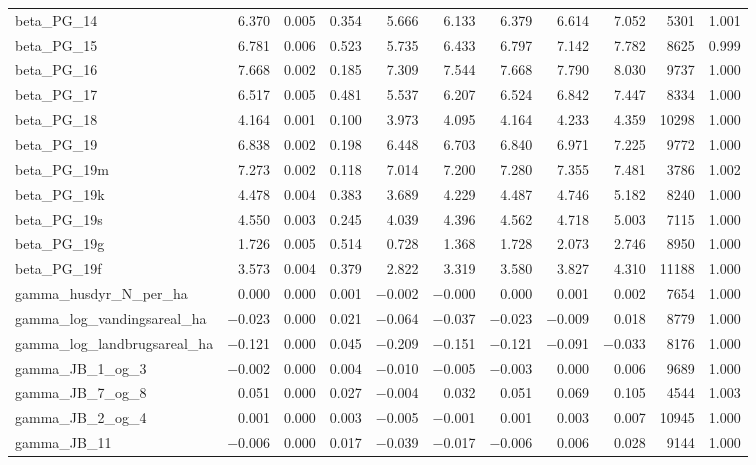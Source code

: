 \documentclass[12pt]{article}
\begin{document}
\begin{longtable}{lrrrrrrrrrr}
beta\_PG\_14  &  6.370 & 0.005 & 0.354 &  5.666 &  6.133 &  6.379 &  6.614 &  7.052 &  5301 & 1.001 \\
beta\_PG\_15  &  6.781 & 0.006 & 0.523 &  5.735 &  6.433 &  6.797 &  7.142 &  7.782 &  8625 & 0.999 \\
beta\_PG\_16  &  7.668 & 0.002 & 0.185 &  7.309 &  7.544 &  7.668 &  7.790 &  8.030 &  9737 & 1.000 \\
beta\_PG\_17  &  6.517 & 0.005 & 0.481 &  5.537 &  6.207 &  6.524 &  6.842 &  7.447 &  8334 & 1.000 \\
beta\_PG\_18  &  4.164 & 0.001 & 0.100 &  3.973 &  4.095 &  4.164 &  4.233 &  4.359 & 10298 & 1.000 \\
beta\_PG\_19  &  6.838 & 0.002 & 0.198 &  6.448 &  6.703 &  6.840 &  6.971 &  7.225 &  9772 & 1.000 \\
beta\_PG\_19m &  7.273 & 0.002 & 0.118 &  7.014 &  7.200 &  7.280 &  7.355 &  7.481 &  3786 & 1.002 \\
beta\_PG\_19k &  4.478 & 0.004 & 0.383 &  3.689 &  4.229 &  4.487 &  4.746 &  5.182 &  8240 & 1.000 \\
beta\_PG\_19s &  4.550 & 0.003 & 0.245 &  4.039 &  4.396 &  4.562 &  4.718 &  5.003 &  7115 & 1.000 \\
beta\_PG\_19g &  1.726 & 0.005 & 0.514 &  0.728 &  1.368 &  1.728 &  2.073 &  2.746 &  8950 & 1.000 \\
beta\_PG\_19f &  3.573 & 0.004 & 0.379 &  2.822 &  3.319 &  3.580 &  3.827 &  4.310 & 11188 & 1.000 \\
\addlinespace
gamma\_husdyr\_N\_per\_ha        &  0.000 & 0.000 & 0.001 & $-$0.002 & $-$0.000 &  0.000 &  0.001 &  0.002 &  7654 & 1.000 \\
gamma\_log\_vandingsareal\_ha   & $-$0.023 & 0.000 & 0.021 & $-$0.064 & $-$0.037 & $-$0.023 & $-$0.009 &  0.018 &  8779 & 1.000 \\
gamma\_log\_landbrugsareal\_ha  & $-$0.121 & 0.000 & 0.045 & $-$0.209 & $-$0.151 & $-$0.121 & $-$0.091 & $-$0.033 &  8176 & 1.000 \\
gamma\_JB\_1\_og\_3  & $-$0.002 & 0.000 & 0.004 & $-$0.010 & $-$0.005 & $-$0.003 &  0.000 &  0.006 &  9689 & 1.000 \\
gamma\_JB\_7\_og\_8  &  0.051 & 0.000 & 0.027 & $-$0.004 &  0.032 &  0.051 &  0.069 &  0.105 &  4544 & 1.003 \\
gamma\_JB\_2\_og\_4  &  0.001 & 0.000 & 0.003 & $-$0.005 & $-$0.001 &  0.001 &  0.003 &  0.007 & 10945 & 1.000 \\
gamma\_JB\_11        & $-$0.006 & 0.000 & 0.017 & $-$0.039 & $-$0.017 & $-$0.006 &  0.006 &  0.028 &  9144 & 1.000 \\

\end{longtable}
\end{document}
